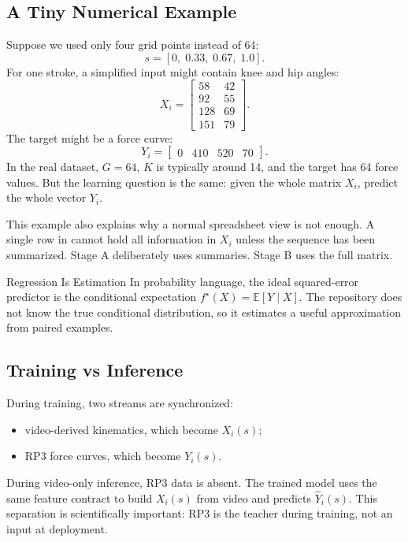 \documentclass[11pt]{article}
\newcommand{\code}[1]{\texttt{\detokenize{#1}}}
\begin{document}
\subsection{A Tiny Numerical Example}

Suppose we used only four grid points instead of 64:
\[
  s = [0,\;0.33,\;0.67,\;1.0].
\]
For one stroke, a simplified input might contain knee and hip angles:
\[
  X_i =
  \begin{bmatrix}
    58 & 42\\
    92 & 55\\
    128 & 69\\
    151 & 79
  \end{bmatrix}.
\]
The target might be a force curve:
\[
  Y_i =
  \begin{bmatrix}
    0 & 410 & 520 & 70
  \end{bmatrix}.
\]
In the real dataset, \(G=64\), \(K\) is typically around 14, and the target has
64 force values. But the learning question is the same: given the whole matrix
\(X_i\), predict the whole vector \(Y_i\).

This example also explains why a normal spreadsheet view is not enough. A
single row in \code{strokes.csv} cannot hold all information in \(X_i\) unless
the sequence has been summarized. Stage A deliberately uses summaries. Stage B
uses the full matrix.

\begin{conceptbox}{Regression Is Estimation}
In probability language, the ideal squared-error predictor is the conditional
expectation \(f^\star(X)=\mathbb{E}[Y\mid X]\). The repository does not know
the true conditional distribution, so it estimates a useful approximation from
paired examples.
\end{conceptbox}

\subsection{Training vs Inference}

During training, two streams are synchronized:
\begin{itemize}[leftmargin=*]
  \item video-derived kinematics, which become \(X_i(s)\);
  \item RP3 force curves, which become \(Y_i(s)\).
\end{itemize}
During video-only inference, RP3 data is absent. The trained model uses the
same feature contract to build \(X_i(s)\) from video and predicts
\(\hat{Y}_i(s)\). This separation is scientifically important: RP3 is the
teacher during training, not an input at deployment.
\end{document}
